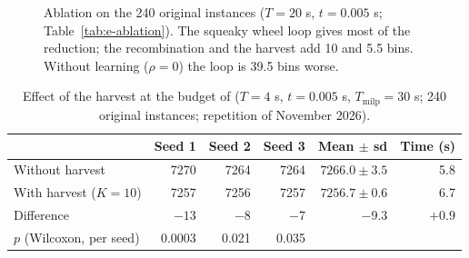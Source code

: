 \begin{figure}[t]
\centering
{}
\caption{Ablation on the 240 original instances ($T=20$ s, $t=0.005$ s; Table~\ref{tab:e-ablation}). The squeaky wheel loop gives most of the
reduction; the recombination and the harvest add 10 and 5.5 bins. Without learning ($\rho=0$) the loop is 39.5 bins worse.}
\label{fig:e-ablation}
\end{figure}

\begin{table}[t]
\centering
\small\setlength{\tabcolsep}{4pt}
\caption{Effect of the harvest at the budget of \cfgfast{} ($T=4$ s, $t=0.005$ s, $T_{\mathrm{milp}}=30$ s; 240 original instances; repetition of November 2026).}
\label{tab:e-harvest}
\begin{tabular}{@{}lrrrrr@{}}
\toprule
 & Seed 1 & Seed 2 & Seed 3 & Mean $\pm$ sd & Time (s)\\
\midrule
Without harvest & 7270 & 7264 & 7264 & $7266.0\pm 3.5$ & 5.8\\
With harvest ($K=10$) & 7257 & 7256 & 7257 & $7256.7\pm 0.6$ & 6.7\\
Difference & $-13$ & $-8$ & $-7$ & $-9.3$ & $+0.9$\\
$p$ (Wilcoxon, per seed) & 0.0003 & 0.021 & 0.035 & & \\
\bottomrule
\end{tabular}
\end{table}

